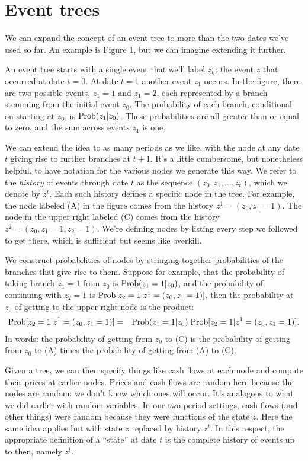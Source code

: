 \documentclass[11pt]{article}
\begin{document}
\section{Event trees}


We can expand the concept of an event tree to more than the two
dates we've used so far.
An example is Figure 1, but we can imagine extending it further.

An event tree starts with a single event that we'll label $z_0$:
the event $z$ that occurred at date $t=0$.
At date $t=1$ another event $z_1$ occurs.
In the figure, there are two possible events, $z_1 = 1$ and $z_1 = 2$,
each represented by a branch stemming from the initial event $z_0$.
The probability of each branch, conditional on starting at $z_0$,
is $\mbox{Prob}(z_1| z_0)$. These probabilities are all greater than or equal to zero,
and the sum across events $z_1$ is one.

We can extend the idea to as many periods as we like,
with the node at any date $t$ giving rise to further branches at $t+1$.
It's a little cumbersome, but nonetheless helpful,
to have notation for the various nodes we generate this way.
We refer to the {\it history\/} of events through date $t$
as the sequence $(z_0, z_1, \ldots, z_t)$, which we denote by $z^t$.
Each such history defines a specific node in the tree.
For example, the node labeled (A) in the figure comes from the history
$z^1 = (z_0, z_1 = 1)$.
The node in the upper right labeled (C)
comes from the history $z^2 = (z_0, z_1 = 1, z_2 = 1)$.
We're defining nodes by listing every step we followed to get there,
which is sufficient but seems like overkill.

We construct probabilities of nodes by stringing together probabilities
of the branches that give rise to them.
Suppose for example, that the probability of
taking branch $z_1=1$ from $z_0$ is $\mbox{Prob}(z_1=1| z_0)$,
and the probability of continuing with $z_2 = 1$ is $\mbox{Prob}[z_2=1 | z^1 = (z_0, z_1=1) ]$,
then the probability at $z_0$ of getting to the upper right node is the product:
\begin{eqnarray*}
    \mbox{Prob}[z_2=1 | z^1 = (z_0, z_1=1) ] &=& \mbox{Prob}(z_1=1| z_0) \; \mbox{Prob}[z_2=1 | z^1 = (z_0, z_1=1) ] .
\end{eqnarray*}
In words:  the probability of getting from $z_0$ to (C)
is the probability of getting from $z_0$ to (A)
times the probability of getting from (A) to (C).


Given a tree, we can then specify things like cash flows at each node 
and compute their prices at earlier nodes.  
Prices and cash flows are random here because the nodes are random:  we don't 
know which ones will occur.  
It's analogous to what we did earlier with random variables.
In our two-period settings, cash flows (and other things) 
were random because they were functions of the state $z$.
Here the same idea applies but with state $z$ replaced by history $z^t$. 
In this respect, the appropriate definition of a ``state'' at date $t$ is the complete
history of events up to then, namely $z^t$.  
\end{document}
